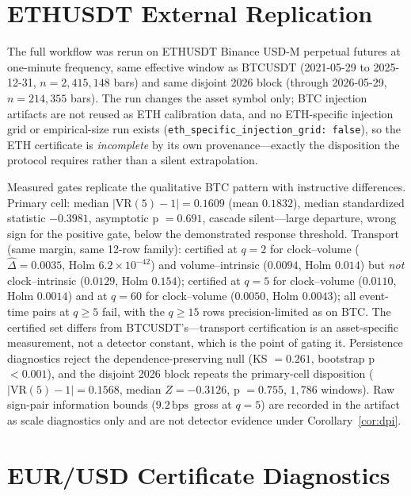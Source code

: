 \documentclass[3p]{elsarticle}
\newcommand{\VR}{\ensuremath{\mathrm{VR}}}
\newcommand{\bps}{\ensuremath{\mathrm{bps}}}
\newcommand{\numbars}{2{,}415{,}148}
\begin{document}
\section{ETHUSDT External Replication}
\label{app:eth}

The full workflow was rerun on ETHUSDT Binance USD-M perpetual futures at
one-minute frequency, same effective window as BTCUSDT (2021-05-29 to
2025-12-31, $n=\numbars$ bars) and same disjoint 2026 block (through
2026-05-29, $n=214{,}355$ bars). The run changes the asset symbol only; BTC
injection artifacts are not reused as ETH calibration data, and no
ETH-specific injection grid or empirical-size run exists
(\texttt{eth\_specific\_injection\_grid: false}), so the ETH certificate is
\emph{incomplete} by its own provenance---exactly the disposition the
protocol requires rather than a silent extrapolation.

Measured gates replicate the qualitative BTC pattern with instructive
differences. Primary cell: median $|\VR(5)-1|=0.1609$ (mean $0.1832$),
median standardized statistic $-0.3981$, asymptotic p $=0.691$, cascade
silent---large departure, wrong sign for the positive gate, below the
demonstrated response threshold. Transport (same margin, same 12-row family):
certified at $q{=}2$ for clock--volume ($\widehat{\Delta}=0.0035$, Holm
$6.2\times10^{-42}$) and volume--intrinsic ($0.0094$, Holm $0.014$) but
\emph{not} clock--intrinsic ($0.0129$, Holm $0.154$); certified at $q{=}5$
for clock--volume ($0.0110$, Holm $0.0014$) and at $q{=}60$ for
clock--volume ($0.0050$, Holm $0.0043$); all event-time pairs at $q\ge5$
fail, with the $q\ge15$ rows precision-limited as on BTC. The certified set
differs from BTCUSDT's---transport certification is an asset-specific
measurement, not a detector constant, which is the point of gating it.
Persistence diagnostics reject the dependence-preserving null
(KS $=0.261$, bootstrap p $<0.001$), and the disjoint 2026 block repeats the
primary-cell disposition ($|\VR(5)-1|=0.1568$, median $Z=-0.3126$,
p $=0.755$, $1{,}786$ windows). Raw sign-pair information bounds
($9.2$\,\bps\ gross at $q{=}5$) are recorded in the artifact as scale
diagnostics only and are not detector evidence under
Corollary~\ref{cor:dpi}.

\section{EUR/USD Certificate Diagnostics}
\label{app:eurusd}
\end{document}
